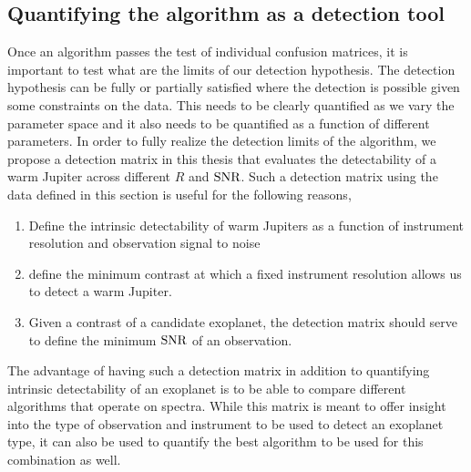 \subsection{Quantifying the algorithm as a detection tool}
Once an algorithm passes the test of individual confusion matrices, it is important to test what are the limits of our detection hypothesis. 
The detection hypothesis can be fully or partially satisfied where the detection is possible given some constraints on the data.
This needs to be clearly quantified as we vary the parameter space and it also needs to be quantified as a function of different parameters.
In order to fully realize the detection limits of the algorithm, we propose a detection matrix in this thesis that evaluates the detectability of a warm Jupiter across different $R$ and $\rm{SNR}$.
Such a detection matrix using the data defined in this section is useful for the following reasons,
\begin{enumerate}
    \item Define the intrinsic detectability of warm Jupiters as a function of instrument resolution and observation signal to noise
    \item define the minimum contrast at which a fixed instrument resolution allows us to detect a warm Jupiter. 
    \item Given a contrast of a candidate exoplanet, the detection matrix should serve to define the minimum $\rm{SNR}$ of an observation.
\end{enumerate}
The advantage of having such a detection matrix in addition to quantifying intrinsic detectability of an exoplanet is to be able to compare different algorithms that operate on spectra.
While this matrix is meant to offer insight into the type of observation and instrument to be used to detect an exoplanet type, it can also be used to quantify the best algorithm to be used for this combination as well.

